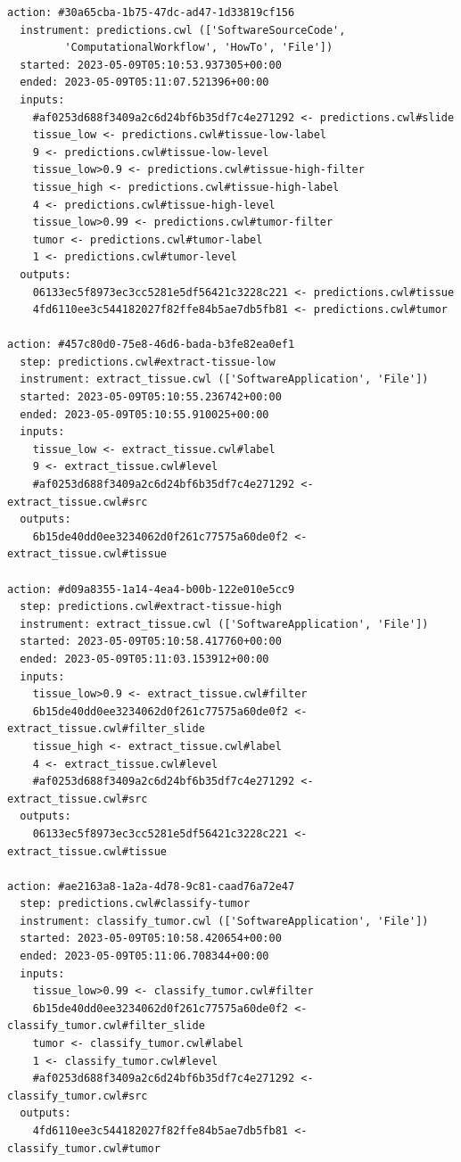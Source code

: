 \documentclass[10pt,letterpaper]{article}
\begin{document}
\begin{adjustwidth}{-1.5cm}{0in}
\label{lst:ml_pipeline_streamflow_report}
\begin{verbatim}
action: #30a65cba-1b75-47dc-ad47-1d33819cf156
  instrument: predictions.cwl (['SoftwareSourceCode', 
         'ComputationalWorkflow', 'HowTo', 'File'])
  started: 2023-05-09T05:10:53.937305+00:00
  ended: 2023-05-09T05:11:07.521396+00:00
  inputs:
    #af0253d688f3409a2c6d24bf6b35df7c4e271292 <- predictions.cwl#slide
    tissue_low <- predictions.cwl#tissue-low-label
    9 <- predictions.cwl#tissue-low-level
    tissue_low>0.9 <- predictions.cwl#tissue-high-filter
    tissue_high <- predictions.cwl#tissue-high-label
    4 <- predictions.cwl#tissue-high-level
    tissue_low>0.99 <- predictions.cwl#tumor-filter
    tumor <- predictions.cwl#tumor-label
    1 <- predictions.cwl#tumor-level
  outputs:
    06133ec5f8973ec3cc5281e5df56421c3228c221 <- predictions.cwl#tissue
    4fd6110ee3c544182027f82ffe84b5ae7db5fb81 <- predictions.cwl#tumor

action: #457c80d0-75e8-46d6-bada-b3fe82ea0ef1
  step: predictions.cwl#extract-tissue-low
  instrument: extract_tissue.cwl (['SoftwareApplication', 'File'])
  started: 2023-05-09T05:10:55.236742+00:00
  ended: 2023-05-09T05:10:55.910025+00:00
  inputs:
    tissue_low <- extract_tissue.cwl#label
    9 <- extract_tissue.cwl#level
    #af0253d688f3409a2c6d24bf6b35df7c4e271292 <- extract_tissue.cwl#src
  outputs:
    6b15de40dd0ee3234062d0f261c77575a60de0f2 <- extract_tissue.cwl#tissue

action: #d09a8355-1a14-4ea4-b00b-122e010e5cc9
  step: predictions.cwl#extract-tissue-high
  instrument: extract_tissue.cwl (['SoftwareApplication', 'File'])
  started: 2023-05-09T05:10:58.417760+00:00
  ended: 2023-05-09T05:11:03.153912+00:00
  inputs:
    tissue_low>0.9 <- extract_tissue.cwl#filter
    6b15de40dd0ee3234062d0f261c77575a60de0f2 <- extract_tissue.cwl#filter_slide
    tissue_high <- extract_tissue.cwl#label
    4 <- extract_tissue.cwl#level
    #af0253d688f3409a2c6d24bf6b35df7c4e271292 <- extract_tissue.cwl#src
  outputs:
    06133ec5f8973ec3cc5281e5df56421c3228c221 <- extract_tissue.cwl#tissue

action: #ae2163a8-1a2a-4d78-9c81-caad76a72e47
  step: predictions.cwl#classify-tumor
  instrument: classify_tumor.cwl (['SoftwareApplication', 'File'])
  started: 2023-05-09T05:10:58.420654+00:00
  ended: 2023-05-09T05:11:06.708344+00:00
  inputs:
    tissue_low>0.99 <- classify_tumor.cwl#filter
    6b15de40dd0ee3234062d0f261c77575a60de0f2 <- classify_tumor.cwl#filter_slide
    tumor <- classify_tumor.cwl#label
    1 <- classify_tumor.cwl#level
    #af0253d688f3409a2c6d24bf6b35df7c4e271292 <- classify_tumor.cwl#src
  outputs:
    4fd6110ee3c544182027f82ffe84b5ae7db5fb81 <- classify_tumor.cwl#tumor
\end{verbatim}
\end{adjustwidth}
\end{document}
